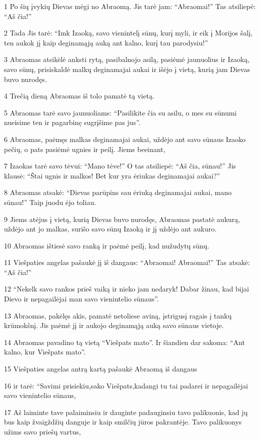 \par 1 Po šių įvykių Dievas mėgi no Abraomą. Jis tarė jam: “Abraomai!” Tas atsiliepė: “Aš čia!” 
\par 2 Tada Jis tarė: “Imk Izaoką, savo vienintelį sūnų, kurį myli, ir eik į Morijos šalį, ten aukok jį kaip deginamąją auką ant kalno, kurį tau parodysiu!” 
\par 3 Abraomas atsikėlė anksti rytą, pasibalnojo asilą, pasiėmė jaunuolius ir Izaoką, savo sūnų, prisiskaldė malkų deginamajai aukai ir išėjo į vietą, kurią jam Dievas buvo nurodęs. 
\par 4 Trečią dieną Abraomas iš tolo pamatė tą vietą. 
\par 5 Abraomas tarė savo jaunuoliams: “Pasilikite čia su asilu, o mes su sūnumi nueisime ten ir pagarbinę sugrįšime pas jus”. 
\par 6 Abraomas, paėmęs malkas deginamajai aukai, uždėjo ant savo sūnaus Izaoko pečių, o pats pasiėmė ugnies ir peilį. Jiems beeinant, 
\par 7 Izaokas tarė savo tėvui: “Mano tėve!” O tas atsiliepė: “Aš čia, sūnau!” Jis klausė: “Štai ugnis ir malkos! Bet kur yra ėriukas deginamajai aukai?” 
\par 8 Abraomas atsakė: “Dievas parūpins sau ėriuką deginamajai aukai, mano sūnau!” Taip juodu ėjo toliau. 
\par 9 Jiems atėjus į vietą, kurią Dievas buvo nurodęs, Abraomas pastatė aukurą, uždėjo ant jo malkas, surišo savo sūnų Izaoką ir jį uždėjo ant aukuro. 
\par 10 Abraomas ištiesė savo ranką ir paėmė peilį, kad nužudytų sūnų. 
\par 11 Viešpaties angelas pašaukė jį iš dangaus: “Abraomai! Abraomai!” Tas atsakė: “Aš čia!” 
\par 12 “Nekelk savo rankos prieš vaiką ir nieko jam nedaryk! Dabar žinau, kad bijai Dievo ir nepagailėjai man savo vienintelio sūnaus”. 
\par 13 Abraomas, pakėlęs akis, pamatė netoliese aviną, įstrigusį ragais į tankų krūmokšnį. Jis paėmė jį ir aukojo deginamąją auką savo sūnaus vietoje. 
\par 14 Abraomas pavadino tą vietą “Viešpats mato”. Ir šiandien dar sakoma: “Ant kalno, kur Viešpats mato”. 
\par 15 Viešpaties angelas antrą kartą pašaukė Abraomą iš dangaus 
\par 16 ir tarė: “Savimi prisiekiu,­sako Viešpats,­kadangi tu tai padarei ir nepagailėjai savo vienintelio sūnaus, 
\par 17 Aš laiminte tave palaiminsiu ir dauginte padauginsiu tavo palikuonis, kad jų bus kaip žvaigždžių danguje ir kaip smilčių jūros pakrantėje. Tavo palikuonys užims savo priešų vartus, 
